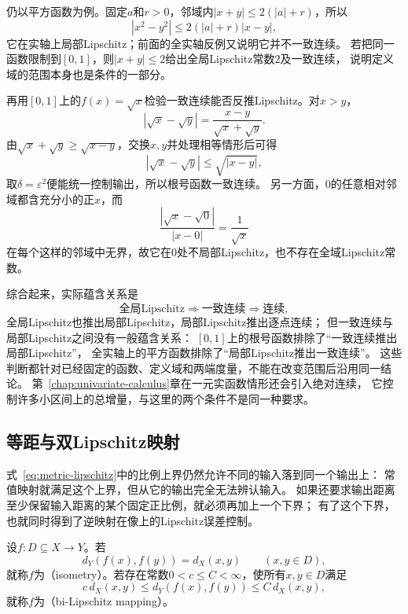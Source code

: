 仍以平方函数为例。固定$a$和$r>0$，邻域内$|x+y|\leq2(|a|+r)$，所以
\[
  |x^2-y^2|\leq 2(|a|+r)|x-y|,
\]
它在实轴上局部Lipschitz；前面的全实轴反例又说明它并不一致连续。
若把同一函数限制到$[0,1]$，则$|x+y|\leq2$给出全局Lipschitz常数$2$及一致连续，
说明定义域的范围本身也是条件的一部分。

再用$[0,1]$上的$f(x)=\sqrt x$检验一致连续能否反推Lipschitz。对$x>y$，
\[
  |\sqrt x-\sqrt y|=\frac{x-y}{\sqrt x+\sqrt y}.
\]
由$\sqrt x+\sqrt y\geq\sqrt{x-y}$，交换$x,y$并处理相等情形后可得
\[
  |\sqrt x-\sqrt y|\leq\sqrt{|x-y|},
\]
取$\delta=\varepsilon^2$便能统一控制输出，所以根号函数一致连续。
另一方面，$0$的任意相对邻域都含充分小的正$x$，而
\[
  \frac{|\sqrt x-\sqrt0|}{|x-0|}=\frac1{\sqrt x}
\]
在每个这样的邻域中无界，故它在$0$处不局部Lipschitz，也不存在全域Lipschitz常数。

综合起来，实际蕴含关系是
\[
  \text{全局Lipschitz}\Longrightarrow\text{一致连续}\Longrightarrow\text{连续},
\]
全局Lipschitz也推出局部Lipschitz，局部Lipschitz推出逐点连续；
但一致连续与局部Lipschitz之间没有一般蕴含关系：
$[0,1]$上的根号函数排除了“一致连续推出局部Lipschitz”，
全实轴上的平方函数排除了“局部Lipschitz推出一致连续”。
这些判断都针对已经固定的函数、定义域和两端度量，不能在改变范围后沿用同一结论。
第~\ref{chap:univariate-calculus}章在一元实函数情形还会引入绝对连续，
它控制许多小区间上的总增量，与这里的两个条件不是同一种要求。

\subsection{等距与双Lipschitz映射}
\label{sec:metric-isometry-bilipschitz}

式~\eqref{eq:metric-lipschitz}中的比例上界仍然允许不同的输入落到同一个输出上：
常值映射就满足这个上界，但从它的输出完全无法辨认输入。
如果还要求输出距离至少保留输入距离的某个固定正比例，就必须再加上一个下界；
有了这个下界，也就同时得到了逆映射在像上的Lipschitz误差控制。

\begin{definition}[等距映射与双Lipschitz映射]
\label{def:metric-isometry-bilipschitz}
设$f:D\subseteq X\to Y$。若
\[
  d_Y(f(x),f(y))=d_X(x,y)\qquad(x,y\in D),
\]
就称$f$为（isometry）。若存在常数$0<c\leq C<\infty$，使所有$x,y\in D$满足
\begin{equation}
\label{eq:metric-bilipschitz}
  c\,d_X(x,y)\leq d_Y(f(x),f(y))\leq C\,d_X(x,y),
\end{equation}
就称$f$为（bi-Lipschitz mapping）。
\end{definition}

